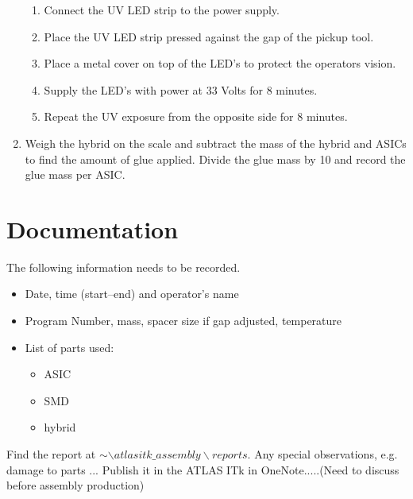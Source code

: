 \documentclass[12pt]{cnihepsop}
\begin{document}
\begin{enumerate}
    \begin{enumerate}
        \item Connect the UV LED strip to the power supply.
        \item Place the UV LED strip pressed against the gap of the pickup tool. 
        \item Place a metal cover on top of the LED's to protect the operators vision.
        \item Supply the LED's with power at 33 Volts for 8 minutes.
        \item Repeat the UV exposure from the opposite side for 8 minutes.  
    \end{enumerate}
    \item Weigh the hybrid on the scale and subtract the mass of the hybrid and ASICs to find the amount of glue applied. Divide the glue mass by 10 and record the glue mass per ASIC.  	
\end{enumerate}


\section{Documentation}
The following information needs to be recorded.
\begin{itemize}
    \item Date, time (start--end) and operator's name
    \item Program Number, mass, spacer size if gap adjusted, temperature
    \item List of parts used:
	\begin{itemize}
	    \item ASIC
	    \item SMD
	    \item hybrid
	\end{itemize}
\end{itemize}

Find the report at $\sim\backslash atlasitk\_assembly\backslash reports$. Any special observations, e.g. damage to parts ... Publish it in the ATLAS ITk in OneNote.....(Need to discuss before assembly production)
\end{document}
